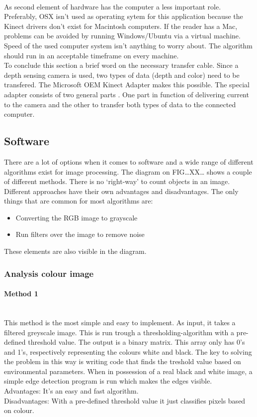 \documentclass[11pt]{article}
\begin{document}
\\ As second element of hardware has the computer a less important role. Preferably, OSX isn't used as operating sytem for this application because the Kinect drivers don't exist for Macintosh computers. If the reader has a Mac, problems can be avoided by running Windows/Ubuntu via a virtual machine. Speed of the used computer system isn't anything to worry about. The algorithm should run in an acceptable timeframe on every machine.\\ To conclude this section a brief word on the necessary transfer cable. Since a depth sensing camera is used, two types of data (depth and color) need to be transfered. The Microsoft OEM Kinect Adapter makes this possible. The special adapter consists of two general parts . One part in function of delivering current to the camera and the other to transfer both types of data to the connected computer. 

\subsection{Software}
There are a lot of options when it comes to software and a wide range of different algorithms exist for image processing. The diagram on FIG…XX… shows a couple of different methods. There is no ‘right-way’ to count objects in an image. Different approaches have their own advantages and disadvantages. The only things that are common for most algorithms are:
\begin{itemize}
\item Converting the RGB image to grayscale
\item Run filters over the image to remove noise
\end{itemize}
These elements are also visible in the diagram.
\subsubsection{Analysis colour image }

\paragraph{Method 1}\mbox{}\\
This method is the most simple and easy to implement. As input, it takes a filtered greyscale image. This is run trough a thresholding-algorithm with a pre-defined threshold value. The output is a binary matrix. This array only has 0's and 1's, respectively representing the colours white and black. The key to solving the problem in this way is writing code that finds the treshold value based on environmental parameters. When in possession of a real black and white image, a simple edge detection program is run which makes the edges visible. 
\\Advantages: It’s an easy and fast algorithm.
\\Disadvantages: With a pre-defined threshold value it just classifies pixels based on colour. 
\end{document}
